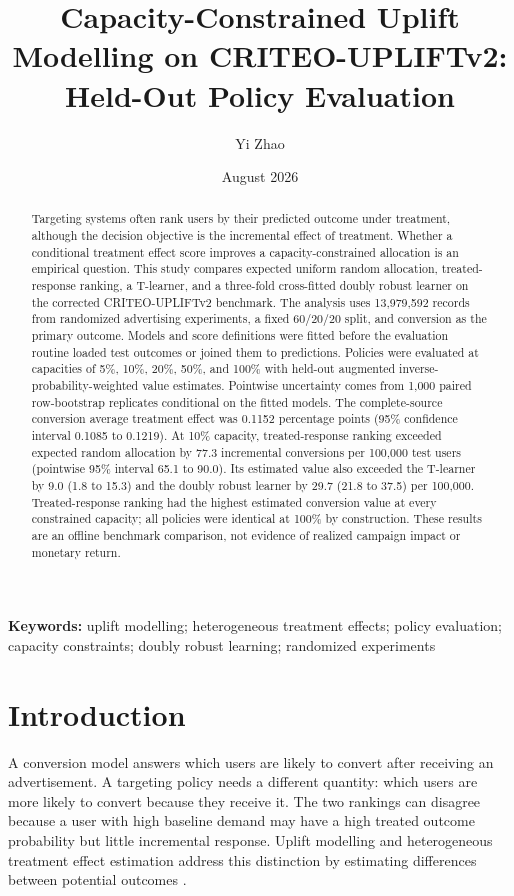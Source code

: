 \documentclass[11pt]{article}
\title{Capacity-Constrained Uplift Modelling on CRITEO-UPLIFTv2:\\
Held-Out Policy Evaluation}
\author{Yi Zhao}
\date{August 2026}
\begin{document}
\maketitle

\begin{abstract}
Targeting systems often rank users by their predicted outcome under treatment, although the decision objective is the incremental effect of treatment. Whether a conditional treatment effect score improves a capacity-constrained allocation is an empirical question. This study compares expected uniform random allocation, treated-response ranking, a T-learner, and a three-fold cross-fitted doubly robust learner on the corrected CRITEO-UPLIFTv2 benchmark. The analysis uses 13,979,592 records from randomized advertising experiments, a fixed 60/20/20 split, and conversion as the primary outcome. Models and score definitions were fitted before the evaluation routine loaded test outcomes or joined them to predictions. Policies were evaluated at capacities of 5\%, 10\%, 20\%, 50\%, and 100\% with held-out augmented inverse-probability-weighted value estimates. Pointwise uncertainty comes from 1,000 paired row-bootstrap replicates conditional on the fitted models. The complete-source conversion average treatment effect was 0.1152 percentage points (95\% confidence interval 0.1085 to 0.1219). At 10\% capacity, treated-response ranking exceeded expected random allocation by 77.3 incremental conversions per 100,000 test users (pointwise 95\% interval 65.1 to 90.0). Its estimated value also exceeded the T-learner by 9.0 (1.8 to 15.3) and the doubly robust learner by 29.7 (21.8 to 37.5) per 100,000. Treated-response ranking had the highest estimated conversion value at every constrained capacity; all policies were identical at 100\% by construction. These results are an offline benchmark comparison, not evidence of realized campaign impact or monetary return.
\end{abstract}

\noindent\textbf{Keywords:} uplift modelling; heterogeneous treatment effects; policy evaluation; capacity constraints; doubly robust learning; randomized experiments

\section{Introduction}

A conversion model answers which users are likely to convert after receiving an advertisement. A targeting policy needs a different quantity: which users are more likely to convert because they receive it. The two rankings can disagree because a user with high baseline demand may have a high treated outcome probability but little incremental response. Uplift modelling and heterogeneous treatment effect estimation address this distinction by estimating differences between potential outcomes \citep{kunzel2019metalearners,diemert2021benchmark}.
\end{document}
